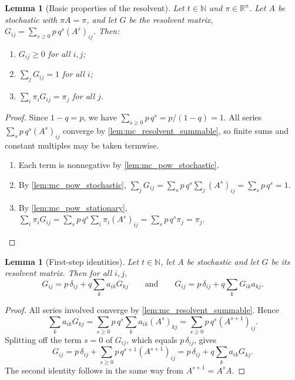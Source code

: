 \documentclass[11pt]{article}
\newtheorem{lemma}[theorem]{Lemma}
\theoremstyle{definition}
\theoremstyle{remark}
\newcommand{\R}{\mathbb{R}}
\newcommand{\N}{\mathbb{N}}
\begin{document}
\begin{lemma}[Basic properties of the resolvent]\label{lem:mc_resolvent_basic}
Let $t\in\N$ and $\pi\in\R^n$. Let $A$ be stochastic with $\pi A=\pi$, and let $G$ be the resolvent matrix, $G_{ij}=\sum_{s\ge0}p\,q^s(A^s)_{ij}$. Then:
\begin{enumerate}
\item $G_{ij}\ge0$ for all $i,j$;
\item $\sum_jG_{ij}=1$ for all $i$;
\item $\sum_i\pi_iG_{ij}=\pi_j$ for all $j$.
\end{enumerate}
\end{lemma}
\begin{proof}
Since $1-q=p$, we have $\sum_{s\ge0}p\,q^s=p/(1-q)=1$. All series $\sum_sp\,q^s(A^s)_{ij}$ converge by \cref{lem:mc_resolvent_summable}, so finite sums and constant multiples may be taken termwise.
\begin{enumerate}
\item Each term is nonnegative by \cref{lem:mc_pow_stochastic}.
\item By \cref{lem:mc_pow_stochastic}, $\sum_jG_{ij}=\sum_sp\,q^s\sum_j(A^s)_{ij}=\sum_sp\,q^s=1$.
\item By \cref{lem:mc_pow_stationary}, $\sum_i\pi_iG_{ij}=\sum_sp\,q^s\sum_i\pi_i(A^s)_{ij}=\sum_sp\,q^s\pi_j=\pi_j$. \qedhere
\end{enumerate}
\end{proof}

\begin{lemma}[First-step identities]\label{lem:mc_resolvent_first_step}
Let $t\in\N$, let $A$ be stochastic and let $G$ be its resolvent matrix. Then for all $i,j$,
\[
G_{ij}=p\,\delta_{ij}+q\sum_ka_{ik}G_{kj}
\qquad\text{and}\qquad
G_{ij}=p\,\delta_{ij}+q\sum_kG_{ik}a_{kj}.
\]
\end{lemma}
\begin{proof}
All series involved converge by \cref{lem:mc_resolvent_summable}. Hence
\[
\sum_ka_{ik}G_{kj}=\sum_{s\ge0}p\,q^s\sum_ka_{ik}(A^s)_{kj}=\sum_{s\ge0}p\,q^s(A^{s+1})_{ij}.
\]
Splitting off the term $s=0$ of $G_{ij}$, which equals $p\,\delta_{ij}$, gives
\[
G_{ij}=p\,\delta_{ij}+\sum_{s\ge0}p\,q^{s+1}(A^{s+1})_{ij}=p\,\delta_{ij}+q\sum_ka_{ik}G_{kj}.
\]
The second identity follows in the same way from $A^{s+1}=A^sA$.
\end{proof}
\end{document}
